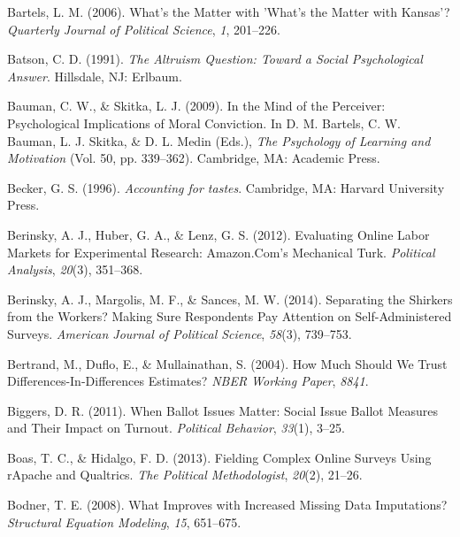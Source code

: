 \documentclass[12pt,econ]{sources/authesis}
\begin{document}
\leavevmode\hypertarget{ref-bartels_2006_whats}{}%
Bartels, L. M. (2006). What's the Matter with 'What's the Matter with Kansas'? \emph{Quarterly Journal of Political Science}, \emph{1}, 201--226.

\leavevmode\hypertarget{ref-batson_altruism_1991}{}%
Batson, C. D. (1991). \emph{The Altruism Question: Toward a Social Psychological Answer}. Hillsdale, NJ: Erlbaum.

\leavevmode\hypertarget{ref-bauman_2009_mind}{}%
Bauman, C. W., \& Skitka, L. J. (2009). In the Mind of the Perceiver: Psychological Implications of Moral Conviction. In D. M. Bartels, C. W. Bauman, L. J. Skitka, \& D. L. Medin (Eds.), \emph{The Psychology of Learning and Motivation} (Vol. 50, pp. 339--362). Cambridge, MA: Academic Press.

\leavevmode\hypertarget{ref-becker_1996_accounting}{}%
Becker, G. S. (1996). \emph{Accounting for tastes}. Cambridge, MA: Harvard University Press.

\leavevmode\hypertarget{ref-berinsky_evaluating_2012}{}%
Berinsky, A. J., Huber, G. A., \& Lenz, G. S. (2012). Evaluating Online Labor Markets for Experimental Research: Amazon.Com's Mechanical Turk. \emph{Political Analysis}, \emph{20}(3), 351--368.

\leavevmode\hypertarget{ref-berinsky_2014_separating}{}%
Berinsky, A. J., Margolis, M. F., \& Sances, M. W. (2014). Separating the Shirkers from the Workers? Making Sure Respondents Pay Attention on Self-Administered Surveys. \emph{American Journal of Political Science}, \emph{58}(3), 739--753.

\leavevmode\hypertarget{ref-bertrand_2004_much}{}%
Bertrand, M., Duflo, E., \& Mullainathan, S. (2004). How Much Should We Trust Differences-In-Differences Estimates? \emph{NBER Working Paper}, \emph{8841}.

\leavevmode\hypertarget{ref-biggers_2011_when}{}%
Biggers, D. R. (2011). When Ballot Issues Matter: Social Issue Ballot Measures and Their Impact on Turnout. \emph{Political Behavior}, \emph{33}(1), 3--25.

\leavevmode\hypertarget{ref-boas_fielding_2013}{}%
Boas, T. C., \& Hidalgo, F. D. (2013). Fielding Complex Online Surveys Using rApache and Qualtrics. \emph{The Political Methodologist}, \emph{20}(2), 21--26.

\leavevmode\hypertarget{ref-bodner_2008_what}{}%
Bodner, T. E. (2008). What Improves with Increased Missing Data Imputations? \emph{Structural Equation Modeling}, \emph{15}, 651--675.
\end{document}
